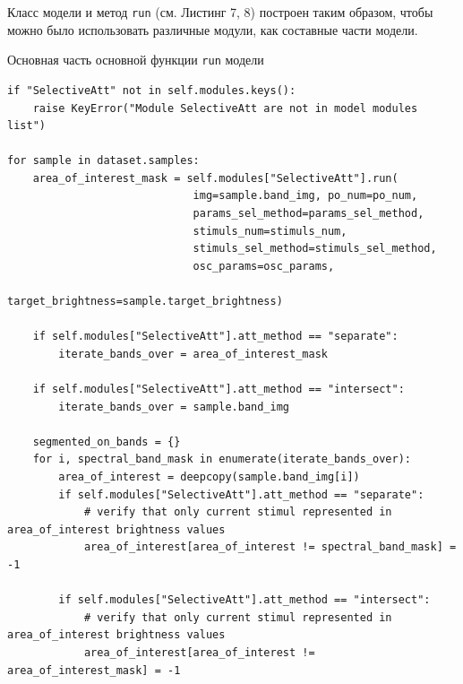 \documentclass[14pt, russian]{scrartcl}
\begin{document}
Класс модели и метод \texttt{run} (см. Листинг 7, 8) построен таким образом, чтобы можно было использовать различные модули, как составные части модели.
\begin{listing}[H]
    \caption{Основная часть основной функции \texttt{run} модели}
    \label{lst:model_run}
    \begin{verbatim}
if "SelectiveAtt" not in self.modules.keys():
    raise KeyError("Module SelectiveAtt are not in model modules list")
        
for sample in dataset.samples:
    area_of_interest_mask = self.modules["SelectiveAtt"].run(
                             img=sample.band_img, po_num=po_num, 
                             params_sel_method=params_sel_method, 
                             stimuls_num=stimuls_num,
                             stimuls_sel_method=stimuls_sel_method,
                             osc_params=osc_params,
                             target_brightness=sample.target_brightness)

    if self.modules["SelectiveAtt"].att_method == "separate":
        iterate_bands_over = area_of_interest_mask

    if self.modules["SelectiveAtt"].att_method == "intersect":
        iterate_bands_over = sample.band_img

    segmented_on_bands = {}
    for i, spectral_band_mask in enumerate(iterate_bands_over):       
        area_of_interest = deepcopy(sample.band_img[i])
        if self.modules["SelectiveAtt"].att_method == "separate":
            # verify that only current stimul represented in area_of_interest brightness values
            area_of_interest[area_of_interest != spectral_band_mask] = -1

        if self.modules["SelectiveAtt"].att_method == "intersect":
            # verify that only current stimul represented in area_of_interest brightness values
            area_of_interest[area_of_interest != area_of_interest_mask] = -1
    \end{verbatim}
\end{listing}
\end{document}
